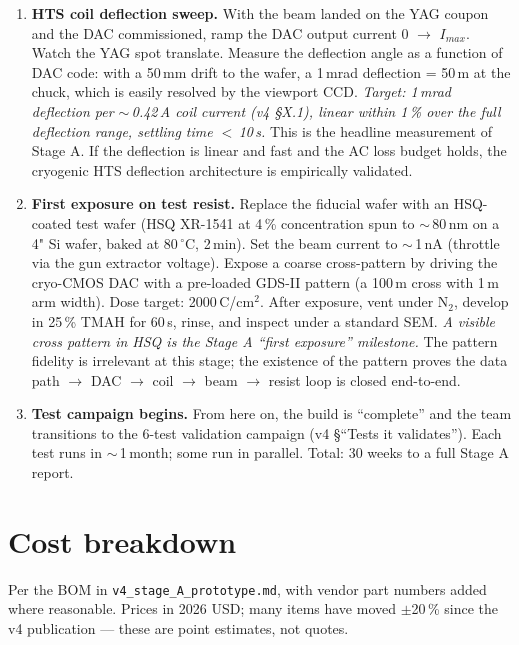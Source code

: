 \documentclass[11pt,letterpaper]{article}
\begin{document}
\begin{enumerate}[leftmargin=1.6em]
  \item \textbf{HTS coil deflection sweep.} With the beam landed on the YAG coupon and the DAC commissioned, ramp the DAC output current 0 $\to$ $I_{max}$. Watch the YAG spot translate. Measure the deflection angle as a function of DAC code: with a 50\,mm drift to the wafer, a 1\,mrad deflection = 50\,\textmu m at the chuck, which is easily resolved by the viewport CCD. \textit{Target: 1\,mrad deflection per $\sim$\,0.42\,A coil current (v4 \S X.1), linear within 1\,\% over the full deflection range, settling time $<$\,10\,\textmu s.} This is the headline measurement of Stage A. If the deflection is linear and fast and the AC loss budget holds, the cryogenic HTS deflection architecture is empirically validated.

  \item \textbf{First exposure on test resist.} Replace the fiducial wafer with an HSQ-coated test wafer (HSQ XR-1541 at 4\,\% concentration spun to $\sim$\,80\,nm on a 4" Si wafer, baked at 80\,$^\circ$C, 2\,min). Set the beam current to $\sim$\,1\,nA (throttle via the gun extractor voltage). Expose a coarse cross-pattern by driving the cryo-CMOS DAC with a pre-loaded GDS-II pattern (a 100\,\textmu m cross with 1\,\textmu m arm width). Dose target: 2000\,\textmu C/cm$^2$. After exposure, vent under N$_2$, develop in 25\,\% TMAH for 60\,s, rinse, and inspect under a standard SEM. \textit{A visible cross pattern in HSQ is the Stage A ``first exposure'' milestone.} The pattern fidelity is irrelevant at this stage; the existence of the pattern proves the data path $\to$ DAC $\to$ coil $\to$ beam $\to$ resist loop is closed end-to-end.

  \item \textbf{Test campaign begins.} From here on, the build is ``complete'' and the team transitions to the 6-test validation campaign (v4 \S ``Tests it validates''). Each test runs in $\sim$\,1\,month; some run in parallel. Total: 30 weeks to a full Stage A report.
\end{enumerate}

\section{Cost breakdown}
\label{sec:bom}

Per the BOM in \texttt{v4\_stage\_A\_prototype.md}, with vendor part numbers added where reasonable. Prices in 2026 USD; many items have moved $\pm$20\,\% since the v4 publication --- these are point estimates, not quotes.
\end{document}
